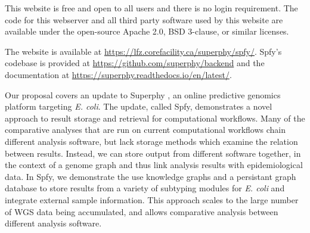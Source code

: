 


This website is free and open to all users and there is no login requirement. The code for this webserver and all third party software used by this website are available under the open-source Apache 2.0, BSD 3-clause, or similar licenses.

The website is available at \url{https://lfz.corefacility.ca/superphy/spfy/}. Spfy's codebase is provided at \url{https://github.com/superphy/backend} and the documentation at \url{https://superphy.readthedocs.io/en/latest/}.

Our proposal covers an update to Superphy \citep{whiteside2016superphy}, an online predictive genomics platform targeting \textit{E. coli}.
The update, called Spfy, demonstrates a novel approach to result storage and retrieval for computational workflows.
Many of the comparative analyses that are run on current computational workflows chain different analysis software, but lack storage methods which examine the relation between results.
Instead, we can store output from different software together, in the context of a genome graph and thus link analysis results with epidemiological data.
In Spfy, we demonstrate the use knowledge graphs and a persistant graph database to store results from a variety of subtyping modules for \textit{E. coli} and integrate external sample information.
This approach scales to the large number of WGS data being accumulated, and allows comparative analysis between different analysis software.

